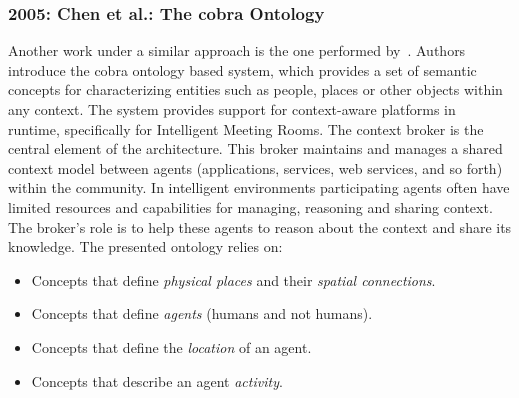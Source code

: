 \subsubsection{2005: Chen et al.: The \ac{cobra} Ontology}
\label{sec:gu}

Another work under a similar approach is the one performed by~\citet{chen_using_2005}.
Authors introduce the \acf{cobra} ontology based system, which provides a set of 
semantic concepts for characterizing entities such as people, places or other 
objects within any context. The system provides support for context-aware 
platforms in runtime, specifically for Intelligent Meeting Rooms. The context 
broker is the central element of the architecture. This broker maintains and 
manages a shared context model between agents (applications, services, web 
services, and so forth) within the community. In intelligent environments participating
agents often have limited resources and capabilities for managing, reasoning and
sharing context. The broker's role is to help these agents to reason about the
context and share its knowledge. The presented ontology relies on:

\begin{itemize}
  \item Concepts that define \textit{physical places} and their \textit{spatial 
  connections}.
  \item Concepts that define \textit{agents} (humans and not humans).
  \item Concepts that define the \textit{location} of an agent.
  \item Concepts that describe an agent \textit{activity}.
\end{itemize}